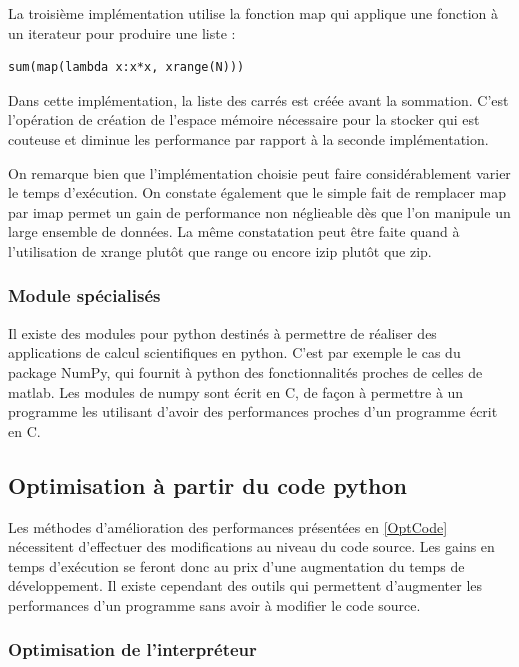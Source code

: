 \documentclass[a4paper]{article}
\begin{document}
La troisième implémentation utilise la fonction map qui applique une fonction à un iterateur pour produire une liste :

\begin{verbatim}
sum(map(lambda x:x*x, xrange(N)))
\end{verbatim}

Dans cette implémentation, la liste des carrés est créée avant la sommation. C'est l'opération de création de l'espace mémoire nécessaire pour la stocker qui est couteuse et diminue les performance par rapport à la seconde implémentation.

On remarque bien que l'implémentation choisie peut faire considérablement varier le temps d'exécution. On constate également que le simple fait de remplacer map par imap permet un gain de performance non néglieable dès que l'on manipule un large ensemble de données. La même constatation peut être faite quand à l'utilisation de xrange plutôt que range ou encore izip plutôt que zip.

\subsubsection{Module spécialisés}

Il existe des modules pour python destinés à permettre de réaliser des applications de calcul scientifiques en python.
C'est par exemple le cas du package NumPy, qui fournit à python des fonctionnalités proches de celles de matlab. Les modules de numpy sont écrit en C, de façon à permettre à un programme les utilisant d'avoir des performances proches d'un programme écrit en C\cite{NumPyPerf}.

\subsection{Optimisation à partir du code python}

Les méthodes d'amélioration des performances présentées en \ref{OptCode} nécessitent d'effectuer des modifications au niveau du code source. Les gains en temps d'exécution se feront donc au prix d'une augmentation du temps de développement. Il existe cependant des outils qui permettent d'augmenter les performances d'un programme sans avoir à modifier le code source.

\subsubsection{Optimisation de l'interpréteur}
\end{document}
